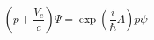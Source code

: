 \begin{equation}
\left( p+\frac{V_{e}}{c}\right) \Psi =\exp \left( \frac{i}{\hbar }\Lambda
\right) p\psi  \label{eq7}
\end{equation}

